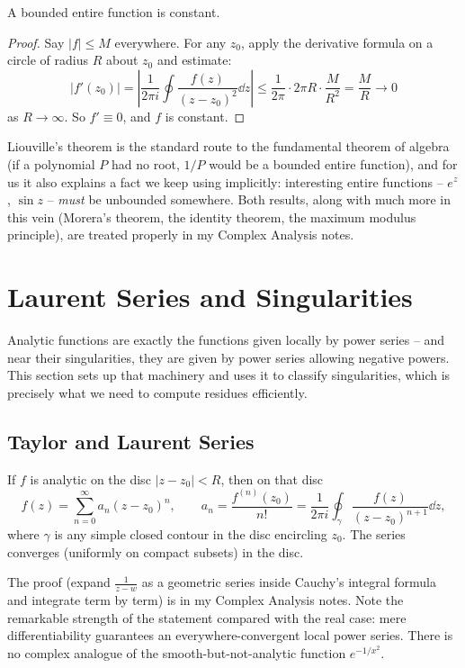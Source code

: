 \documentclass[a4paper]{scrartcl}
\begin{document}
\begin{theorem}
	A bounded entire function is constant.
\end{theorem}
\begin{proof}
	Say $|f| \leq M$ everywhere. For any $z_0$, apply the derivative formula on a circle of radius $R$ about $z_0$ and estimate:
	$$
	|f'(z_0)| = \left|\frac{1}{2\pi i} \oint \frac{f(z)}{(z - z_0)^2} \dd z\right| \leq \frac{1}{2\pi} \cdot 2\pi R \cdot \frac{M}{R^2} = \frac MR \to 0
	$$
	as $R \to \infty$. So $f' \equiv 0$, and $f$ is constant.
\end{proof}

Liouville's theorem is the standard route to the fundamental theorem of algebra (if a polynomial $P$ had no root, $1/P$ would be a bounded entire function), and for us it also explains a fact we keep using implicitly: interesting entire functions -- $e^z$, $\sin z$ -- \emph{must} be unbounded somewhere. Both results, along with much more in this vein (Morera's theorem, the identity theorem, the maximum modulus principle), are treated properly in my Complex Analysis notes.

\section{Laurent Series and Singularities}

Analytic functions are exactly the functions given locally by power series -- and near their singularities, they are given by power series allowing negative powers. This section sets up that machinery and uses it to classify singularities, which is precisely what we need to compute residues efficiently.

\subsection{Taylor and Laurent Series}

\begin{theorem}
	If $f$ is analytic on the disc $|z - z_0| < R$, then on that disc
	$$
	f(z) = \sum_{n = 0}^\infty a_n (z - z_0)^n, \qquad a_n = \frac{f^{(n)}(z_0)}{n!} = \frac{1}{2\pi i}\oint_\gamma \frac{f(z)}{(z - z_0)^{n+1}} \dd z,
	$$
	where $\gamma$ is any simple closed contour in the disc encircling $z_0$. The series converges (uniformly on compact subsets) in the disc.
\end{theorem}

The proof (expand $\frac{1}{z - w}$ as a geometric series inside Cauchy's integral formula and integrate term by term) is in my Complex Analysis notes. Note the remarkable strength of the statement compared with the real case: mere differentiability guarantees an everywhere-convergent local power series. There is no complex analogue of the smooth-but-not-analytic function $e^{-1/x^2}$.
\end{document}
